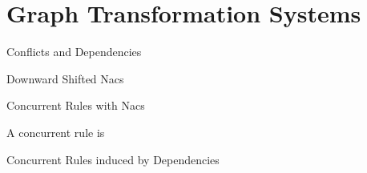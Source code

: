 \chapter{Graph Transformation Systems}

\begin{mydef}{Conflicts and Dependencies}
\end{mydef}

\begin{mydef}{Downward Shifted Nacs}

\centerline{}


\end{mydef}

\begin{mydef}{Concurrent Rules with Nacs}

A concurrent rule is
\end{mydef}

\centerline{
}

\begin{mydef}{Concurrent Rules induced by Dependencies}
\end{mydef}

